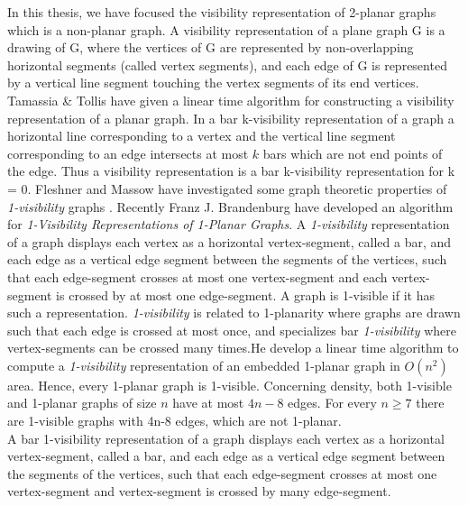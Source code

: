 In this thesis, we have focused the visibility representation of 2-planar graphs which is a non-planar graph. A visibility representation of a plane graph G is a drawing of G, where the vertices of G are represented by non-overlapping horizontal segments (called vertex segments), and each edge of G is represented by a vertical line segment touching the vertex segments of its end vertices. Tamassia \& Tollis \cite{R} have given a linear time algorithm for constructing a visibility representation of a planar graph. In a bar k-visibility representation of a graph a horizontal line corresponding to a vertex and the vertical line segment corresponding to an edge intersects at most $k$ bars which are not end points of the edge. Thus a visibility representation is a bar k-visibility representation for k = 0. Fleshner and Massow have investigated some graph theoretic properties of  \emph{1-visibility} graphs \cite{S}. 
Recently Franz J. Brandenburg \cite{FJ} have developed an algorithm for \emph{1-Visibility Representations of 1-Planar Graphs}. A \emph{1-visibility} representation of a graph displays each vertex as a horizontal vertex-segment, called a bar, and each edge as a vertical edge segment between the segments of the vertices, such that each edge-segment crosses at most one vertex-segment and each vertex-segment is crossed by at most one edge-segment. A graph is 1-visible if it has such a representation. \emph{1-visibility} is related to 1-planarity where graphs are drawn such that each edge is crossed at most once, and specializes bar \emph{1-visibility} where vertex-segments can be crossed many times.He develop a linear time algorithm to compute a \emph{1-visibility} representation of an embedded 1-planar graph in $O(n^{2})$ area. Hence, every 1-planar graph is 1-visible. Concerning density, both 1-visible and 1-planar graphs of size $n$ have at most $4n-8$ edges. For every $n \geq 7$ there are 1-visible graphs with 4n-8 edges, which are not 1-planar.
\\
A bar 1-visibility representation of a graph displays each vertex as a horizontal vertex-segment, called a bar, and each edge as a vertical edge segment between the segments of the vertices, such that each edge-segment crosses at most one vertex-segment and  vertex-segment is crossed by many edge-segment.

